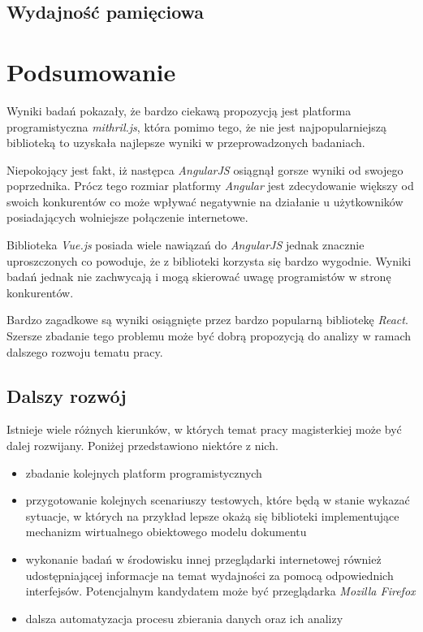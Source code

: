 \documentclass[polish, twoside, 12pt]{mwart}
\let\stdsection\section
\renewcommand*{\section}{\clearpage\stdsection}
\begin{document}
\subsection{Wydajność pamięciowa}

\section{Podsumowanie}

Wyniki badań pokazały, że bardzo ciekawą propozycją jest platforma programistyczna \emph{mithril.js}, która pomimo tego, że nie jest najpopularniejszą biblioteką to uzyskała najlepsze wyniki w przeprowadzonych badaniach. 

Niepokojący jest fakt, iż następca \emph{AngularJS} osiągnął gorsze wyniki od swojego poprzednika. Prócz tego rozmiar platformy \emph{Angular} jest zdecydowanie większy od swoich konkurentów co może wpływać negatywnie na działanie u użytkowników posiadających wolniejsze połączenie internetowe.

Biblioteka \emph{Vue.js} posiada wiele nawiązań do \emph{AngularJS} jednak znacznie uproszczonych co powoduje, że z biblioteki korzysta się bardzo wygodnie. Wyniki badań jednak nie zachwycają i mogą skierować uwagę programistów w stronę konkurentów.

Bardzo zagadkowe są wyniki osiągnięte przez bardzo popularną bibliotekę \emph{React}. Szersze zbadanie tego problemu może być dobrą propozycją do analizy w ramach dalszego rozwoju tematu pracy.

\subsection{Dalszy rozwój}

Istnieje wiele różnych kierunków, w których temat pracy magisterkiej może być dalej rozwijany. Poniżej przedstawiono niektóre z nich.

\begin{itemize}
  \item zbadanie kolejnych platform programistycznych
  \item przygotowanie kolejnych scenariuszy testowych, które będą w stanie wykazać sytuacje, w których na przykład lepsze okażą się biblioteki implementujące mechanizm wirtualnego obiektowego modelu dokumentu
  \item wykonanie badań w środowisku innej przeglądarki internetowej również udostępniającej informacje na temat wydajności za pomocą odpowiednich interfejsów. Potencjalnym kandydatem może być przeglądarka \emph{Mozilla Firefox} \cite{firefox}
  \item dalsza automatyzacja procesu zbierania danych oraz ich analizy
\end{itemize}
\end{document}
